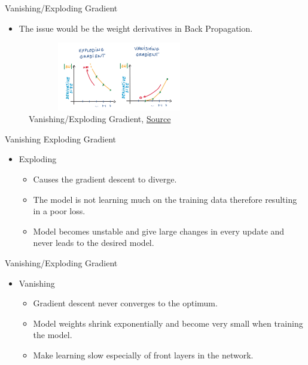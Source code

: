 \begin{frame}{Vanishing/Exploding Gradient}
	\begin{itemize}
		\item The issue would be the weight derivatives in Back Propagation.
	\end{itemize}
	\begin{figure}
		\centering
		\includegraphics[width=8cm, height=3cm]{Figs/van_2.png}
		\caption{Vanishing/Exploding Gradient, \href{https://medium.com/@ayushch612/vanishing-gradient-and-exploding-gradient-problems-7737c0aa535f}{Source}}
	\end{figure}
\end{frame}

\begin{frame}{Vanishing Exploding Gradient}
	\begin{itemize}
		\item Exploding
		\begin{itemize}
			\item Causes the gradient descent to diverge. 
			\item The model is not learning much on the training data therefore resulting in a poor loss.
			\item Model becomes unstable and give large changes in every update and never leads to the desired model.
		\end{itemize}
	\end{itemize}
\end{frame}

\begin{frame}{Vanishing/Exploding Gradient}
	\begin{itemize}
		\item Vanishing
		\begin{itemize}
			\item Gradient descent never converges to the optimum. 
			\item Model weights shrink exponentially and become very small when training the model.
			\item Make learning slow especially of front layers in the network.
		\end{itemize}
	\end{itemize}
\end{frame}